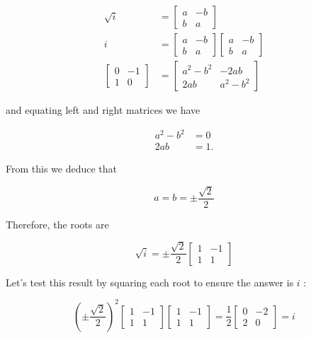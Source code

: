 $$
\begin{aligned}
\sqrt{i} & =\left[\begin{array}{cc}
a & -b \\
b & a
\end{array}\right] \\
i & =\left[\begin{array}{cc}
a & -b \\
b & a
\end{array}\right]\left[\begin{array}{cc}
a & -b \\
b & a
\end{array}\right] \\
{\left[\begin{array}{cc}
0 & -1 \\
1 & 0
\end{array}\right] } & =\left[\begin{array}{cc}
a^{2}-b^{2} & -2 a b \\
2 a b & a^{2}-b^{2}
\end{array}\right]
\end{aligned}
$$

and equating left and right matrices we have

$$
\begin{aligned}
a^{2}-b^{2} & =0 \\
2 a b & =1 .
\end{aligned}
$$

From this we deduce that

$$
a=b= \pm \frac{\sqrt{2}}{2}
$$

Therefore, the roots are

$$
\sqrt{i}= \pm \frac{\sqrt{2}}{2}\left[\begin{array}{cc}
1 & -1 \\
1 & 1
\end{array}\right]
$$

Let's test this result by squaring each root to ensure the answer is $i$ :

$$
\left( \pm \frac{\sqrt{2}}{2}\right)^{2}\left[\begin{array}{cc}
1 & -1 \\
1 & 1
\end{array}\right]\left[\begin{array}{cc}
1 & -1 \\
1 & 1
\end{array}\right]=\frac{1}{2}\left[\begin{array}{cc}
0 & -2 \\
2 & 0
\end{array}\right]=i
$$

